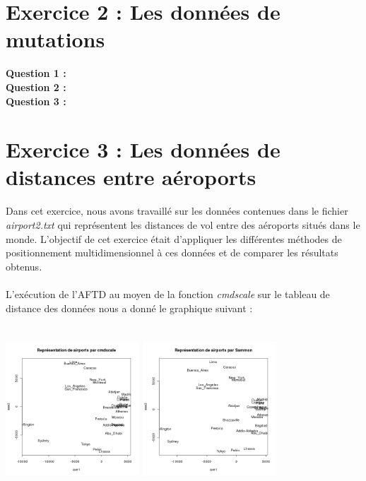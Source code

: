 \documentclass[a4paper, 10pt]{article}
\begin{document}
\section*{Exercice 2 : Les données de mutations}
\textbf{Question 1 :}\\
\textbf{Question 2 :}\\
\textbf{Question 3 :}\\

\section*{Exercice 3 : Les données de distances entre aéroports}
Dans cet exercice, nous avons travaillé sur les données contenues dans le fichier \textit{airport2.txt} qui représentent les distances de vol
entre des aéroports situés dans le monde. L'objectif de cet exercice était d'appliquer les différentes méthodes
de positionnement multidimensionnel à ces données et de comparer les résultats obtenus.\\ \\
L'exécution de l'AFTD au moyen de la fonction \textit{cmdscale} sur le tableau de distance des données nous a donné le graphique suivant :\\
\includegraphics[height = 7cm, width = 5cm]{plots/plot_airports_cmdscale.png}
\includegraphics[height = 7cm, width = 5cm]{plots/plot_airports_sammon.png}
\end{document}

